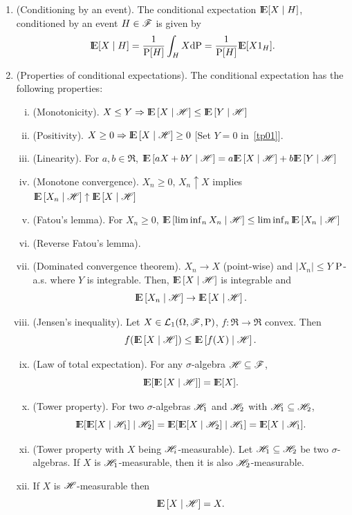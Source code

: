 \documentclass[a4paper,10pt]{article}
\newcommand{\ce}[1]{\E\left[#1 {}\mid{} \HH \right]}
\begin{document}
\begin{enumerate}
 \item (Conditioning by an event). The conditional expectation $\E[X\mid H]$, conditioned
       by an event $H\in\mathscr{F}$ is given by
       \[
        \E[X\mid H] = \frac{1}{\prob[H]}\int_H X\d\prob = \frac{1}{\prob[H]}\E[X1_H].
       \]

 \item (Properties of conditional expectations). 
       The conditional expectation has the following properties:
       \begin{enumerate}[i.]
	\item \label{tp01} (Monotonicity). $X\leq Y \Rightarrow \ce{X} \leq \ce{Y}$
	\item (Positivity).  $X\geq 0 \Rightarrow \ce{X} \geq 0$ [Set $Y=0$ in~\ref{tp01}]. 
	\item (Linearity). For $a,b\in\Re$, $\ce{aX+bY}=a\ce{X} + b \ce{Y}$
	\item (Monotone convergence). $X_n\geq 0$, $X_n \uparrow X$ implies $\ce{X_n}\uparrow \ce{X}$
	\item (Fatou's lemma). For $X_n\geq 0$, $\ce{\liminf_n X_n}\leq \liminf_n \ce{X_n}$
	\item (Reverse Fatou's lemma).
	\item (Dominated convergence theorem). $X_n\to X$ (point-wise) and $|X_n|\leq Y$ $\mathrm{P}$-a.s. where $Y$ is
	      integrable. Then, $\ce{X}$ is integrable and 
	      \[
	       \ce{X_n} \to \ce{X}.
	      \]
        \item (Jensen's inequality). Let $X\in\mathcal{L}_1(\Omega,\mathscr{F},\mathrm{P})$, $f:\Re\to\Re$ convex. Then
	      \[
	      f(\ce{X})\leq \ce{f(X)}.
	      \]
        \item (Law of total expectation). For any $\sigma$-algebra $\mathscr{H} \subseteq \mathscr{F}$,
	      \[
	       \E[\ce{X}] = \E[X].
	      \]
        \item (Tower property). For two $\sigma$-algebras $\mathscr{H}_1$ and $\mathscr{H}_2$ with $\mathscr{H}_1\subseteq \mathscr{H}_2$,	      
	      \[
	       \E[\E[X {}\mid{} \HH_1] {}\mid{} \HH_2] = \E[\E[X {}\mid{} \HH_2] {}\mid{} \HH_1] = \E[X {}\mid{} \HH_1].
	      \]
        \item (Tower property with $X$ being $\mathscr{H}_i$-measurable). Let $\mathscr{H}_1\subseteq \mathscr{H}_2$ be two $\sigma$-algebras. 
	      If $X$ is $\mathscr{H}_1$-measurable, then it is also $\mathscr{H}_2$-measurable.
	    

        \item If $X$ is $\mathscr{H}$-measurable then
	      \[
	       \ce{X} = X.
	      \]

       \end{enumerate}
\end{enumerate}
\end{document}

